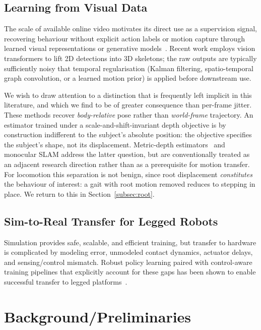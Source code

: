 \documentclass{article}
\theoremstyle{plain}
\theoremstyle{definition}
\theoremstyle{remark}
\begin{document}
\subsection{Learning from Visual Data}
The scale of available online video motivates its direct use as a supervision
signal, recovering behaviour without explicit action labels or motion capture
through learned visual representations or generative
models~\citep{albaba2025nilnodataimitationlearning,
finn2017oneshotvisualimitationlearning}. Recent work employs vision
transformers to lift 2D detections into 3D skeletons; the raw outputs are
typically sufficiently noisy that temporal regularisation (Kalman filtering,
spatio-temporal graph convolution, or a learned motion prior) is applied
before downstream use.
 
We wish to draw attention to a distinction that is frequently left implicit in
this literature, and which we find to be of greater consequence than
per-frame jitter. These methods recover \emph{body-relative} pose rather than
\emph{world-frame} trajectory. An estimator trained under a
scale-and-shift-invariant depth objective is by construction indifferent to
the subject's absolute position: the objective specifies the subject's shape,
not its displacement. Metric-depth
estimators~\citep{piccinelli2024unidepth, yin2023metric3d} and monocular SLAM
address the latter question, but are conventionally treated as an adjacent
research direction rather than as a prerequisite for motion transfer. For
locomotion this separation is not benign, since root displacement
\emph{constitutes} the behaviour of interest: a gait with root motion removed
reduces to stepping in place. We return to this in Section~\ref{subsec:root}.

\subsection{Sim-to-Real Transfer for Legged Robots}
Simulation provides safe, scalable, and efficient training, but transfer to
hardware is complicated by modeling error, unmodeled contact dynamics, actuator
delays, and sensing/control mismatch. Robust policy learning paired with
control-aware training pipelines that explicitly account for these gaps has been
shown to enable successful transfer to legged
platforms~\cite{peng2020learningagileroboticlocomotion}.

\section{Background/Preliminaries}
\end{document}

